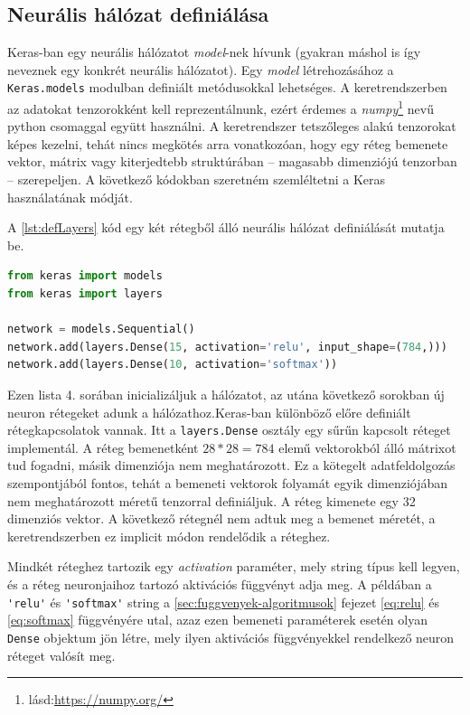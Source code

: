 \subsection{Neurális hálózat definiálása}
Keras-ban egy neurális hálózatot \emph{model}-nek hívunk (gyakran máshol is így neveznek egy konkrét neurális hálózatot). Egy \emph{model} létrehozásához a \verb|Keras.models| modulban definiált metódusokkal lehetséges. A keretrendszerben az adatokat tenzorokként kell reprezentálnunk, ezért érdemes a \emph{numpy}\footnote{lásd:\url{https://numpy.org/}} nevű python csomaggal együtt használni. A keretrendszer tetszőleges alakú tenzorokat képes kezelni, tehát nincs megkötés arra vonatkozóan, hogy egy réteg bemenete vektor, mátrix vagy kiterjedtebb struktúrában -- magasabb dimenziójú tenzorban -- szerepeljen. A következő kódokban szeretném szemléltetni a Keras használatának módját.

A \ref{lst:defLayers} kód egy két rétegből álló neurális hálózat definiálását mutatja be.
\begin{minipage}{\textwidth}
\begin{lstlisting}[language=Python, caption=Neurális hálózat rétegeinek definiálása]
from keras import models
from keras import layers

network = models.Sequential()
network.add(layers.Dense(15, activation='relu', input_shape=(784,)))
network.add(layers.Dense(10, activation='softmax'))
\end{lstlisting}\label{lst:defLayers}
\end{minipage}
Ezen lista 4. sorában inicializáljuk a hálózatot, az utána következő sorokban új neuron rétegeket adunk a hálózathoz.Keras-ban különböző előre definiált rétegkapcsolatok vannak. Itt a \verb|layers.Dense| osztály egy sűrűn kapcsolt réteget implementál. 
A réteg bemenetként $28 *28 = 784$ elemű vektorokból álló mátrixot tud fogadni, másik dimenziója nem meghatározott. Ez a kötegelt adatfeldolgozás szempontjából fontos, tehát a bemeneti vektorok folyamát egyik dimenziójában nem meghatározott méretű tenzorral definiáljuk. A réteg kimenete egy 32 dimenziós vektor. A következő rétegnél nem adtuk meg a bemenet méretét, a keretrendszerben ez implicit módon rendelődik a réteghez. 

Mindkét réteghez tartozik egy \emph{activation} paraméter, mely string típus kell legyen, és a réteg neuronjaihoz tartozó aktivációs függvényt adja meg. A példában a \verb|'relu'| és \verb|'softmax'| string a \ref{sec:fuggvenyek-algoritmusok} fejezet \eqref{eq:relu} és \eqref{eq:softmax} függvényére utal, azaz ezen bemeneti paraméterek esetén olyan \verb|Dense| objektum jön létre, mely ilyen aktivációs függvényekkel rendelkező neuron réteget valósít meg.

